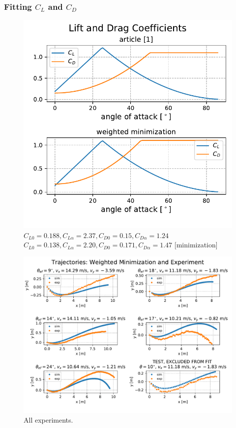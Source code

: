 \documentclass{beamer}
\begin{document}
\begin{frame}

\frametitle{Fitting $C_L$ and $C_D$}

\begin{figure}[H]
	\centering
	  \includegraphics[width=0.6 \textwidth]{cji_clanek_weighted.pdf}
	  \captionsetup{justification=centering,margin=0cm}
	  \caption{$C_{L0} = 0.188, C_{L \alpha}= 2.37, C_{D0} = 0.15, C_{D \alpha} = 1.24$ \cite{clanek} \\
	  $C_{L0} = 0.138, C_{L \alpha}= 2.20, C_{D0} = 0.171, C_{D \alpha} = 1.47$ [minimization]}
\end{figure}

\end{frame}

\begin{frame}

\begin{figure}[H]
	\centering
	  \includegraphics[width= \textwidth]{traj_weighted_mini.pdf}
	  \captionsetup{justification=centering,margin=0cm}
	  \caption{All experiments.}
\end{figure}

\end{frame}
\end{document}
